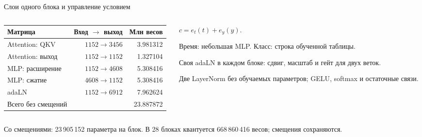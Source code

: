 \documentclass[aspectratio=169,10pt]{beamer}
\newcommand{\takeaway}[1]{\par\vspace{1.5mm}{\bfseries #1\par}}
\newcommand{\smalltext}[1]{{\fontsize{10}{12}\selectfont #1\par}}
\newenvironment{datatable}{\par\begingroup\fontsize{10}{12}\selectfont\setlength{\tabcolsep}{4pt}\renewcommand{\arraystretch}{1.25}}{\par\endgroup}
\begin{document}
\begin{frame}[t]{Слои одного блока и управление условием}
  \begin{columns}[T,onlytextwidth]
    \begin{column}{.62\textwidth}
      \begin{datatable}
        \begin{tabular}{@{}lrr@{}}
          \toprule
          Матрица & Вход $\to$ выход & Млн весов \\
          \midrule
          Attention: QKV & $1152\to3456$ & 3.981312 \\
          Attention: выход & $1152\to1152$ & 1.327104 \\
          MLP: расширение & $1152\to4608$ & 5.308416 \\
          MLP: сжатие & $4608\to1152$ & 5.308416 \\
          adaLN & $1152\to6912$ & 7.962624 \\
          \midrule
          Всего без смещений & & 23.887872 \\
          \bottomrule
        \end{tabular}
      \end{datatable}
    \end{column}
    \begin{column}{.35\textwidth}
      $c=e_t(t)+e_y(y)$.
      \par Время: небольшая MLP. Класс: строка обученной таблицы.
      \par Своя adaLN в каждом блоке: сдвиг, масштаб и гейт для двух веток.
      \par Две LayerNorm без обучаемых параметров; GELU, softmax и остаточные связи.
    \end{column}
  \end{columns}
  \smalltext{Со смещениями: 23\,905\,152 параметра на блок. В 28 блоках квантуется
  668\,860\,416 весов; смещения сохраняются.}
  \takeaway{Attention связывает токены, MLP меняет признаки, adaLN управляет обеими ветками.}
\end{frame}
\end{document}
